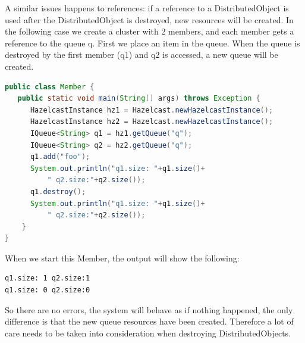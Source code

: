 A similar issues happens to references: if a reference to a DistributedObject is used after the DistributedObject is destroyed, new resources will be created. In the following case we create a cluster with 2 members, and each member gets a reference to the queue q. First we place an item in the queue. When the queue is destroyed by the first member (q1) and q2 is accessed, a new queue will be created. 
\begin{lstlisting}[language=java]
public class Member {
   public static void main(String[] args) throws Exception {
      HazelcastInstance hz1 = Hazelcast.newHazelcastInstance();
      HazelcastInstance hz2 = Hazelcast.newHazelcastInstance();
      IQueue<String> q1 = hz1.getQueue("q");
      IQueue<String> q2 = hz2.getQueue("q");
      q1.add("foo");
      System.out.println("q1.size: "+q1.size()+
          " q2.size:"+q2.size());
      q1.destroy();
      System.out.println("q1.size: "+q1.size()+
          " q2.size:"+q2.size());
    }
}
\end{lstlisting}
When we start this Member, the output will show the following:
\begin{lstlisting}
q1.size: 1 q2.size:1
q1.size: 0 q2.size:0
\end{lstlisting}
So there are no errors, the system will behave as if nothing happened, the only difference is that the new queue resources have been created. Therefore a lot of care needs to be taken into consideration when destroying DistributedObjects. 

